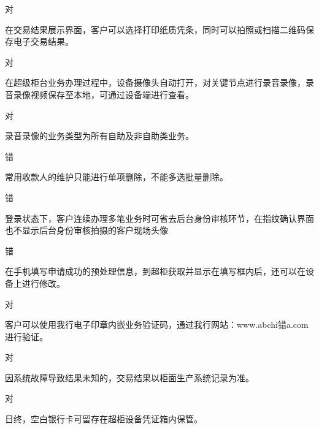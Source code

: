 \documentclass[kindlepaper]{BHCexam4kindle}
\begin{document}
\begin{questions}
\begin{solution} 对 \end{solution}
\qs 在交易结果展示界面，客户可以选择打印纸质凭条，同时可以拍照或扫描二维码保存电子交易结果。 \xx
\begin{solution} 对 \end{solution}
\qs 在超级柜台业务办理过程中，设备摄像头自动打开，对关键节点进行录音录像，录音录像视频保存至本地，可通过设备端进行查看。 \xx
\begin{solution} 对 \end{solution}
\qs 录音录像的业务类型为所有自助及非自助类业务。 \xx
\begin{solution} 错 \end{solution}
\qs 常用收款人的维护只能进行单项删除，不能多选批量删除。 \xx
\begin{solution} 错 \end{solution}
\qs 登录状态下，客户连续办理多笔业务时可省去后台身份审核环节，在指纹确认界面也不显示后台身份审核拍摄的客户现场头像 \xx
\begin{solution} 错 \end{solution}
\qs 在手机填写申请成功的预处理信息，到超柜获取并显示在填写框内后，还可以在设备上进行修改。 \xx
\begin{solution} 对 \end{solution}
\qs 客户可以使用我行电子印章内嵌业务验证码，通过我行网站：www.abchi错a.com进行验证。 \xx
\begin{solution} 对 \end{solution}
\qs 因系统故障导致结果未知的，交易结果以柜面生产系统记录为准。 \xx
\begin{solution} 对 \end{solution}
\qs 日终，空白银行卡可留存在超柜设备凭证箱内保管。 \xx

\end{questions}
\end{document}
